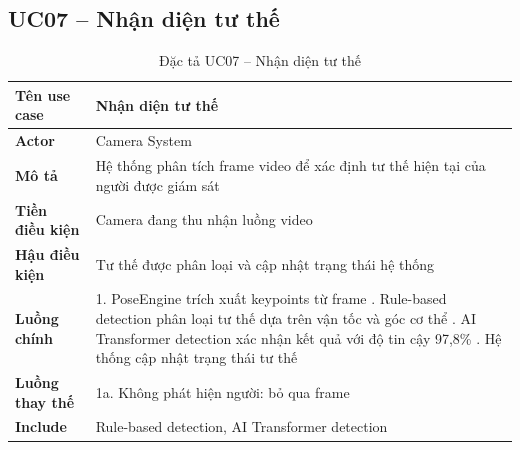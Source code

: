 \subsection*{UC07 -- Nhận diện tư thế}
\begin{table}[H]
    \captionsetup{justification=raggedright, singlelinecheck=false}
    \caption{Đặc tả UC07 -- Nhận diện tư thế}
\centering
\begin{tabular}{|p{3.5cm}|p{10cm}|}
\hline
\textbf{Tên use case} & Nhận diện tư thế \\
\hline
\textbf{Actor} & Camera System \\
\hline
\textbf{Mô tả} & Hệ thống phân tích frame video để xác định
  tư thế hiện tại của người được giám sát \\
\hline
\textbf{Tiền điều kiện} & Camera đang thu nhận luồng video \\
\hline
\textbf{Hậu điều kiện} & Tư thế được phân loại và cập nhật
  trạng thái hệ thống \\
\hline
\textbf{Luồng chính} &
  1. PoseEngine trích xuất keypoints từ frame \newline
  2. Rule-based detection phân loại tư thế dựa trên
     vận tốc và góc cơ thể \newline
  3. AI Transformer detection xác nhận kết quả với
     độ tin cậy 97,8\% \newline
  4. Hệ thống cập nhật trạng thái tư thế \\
\hline
\textbf{Luồng thay thế} &
  1a. Không phát hiện người: bỏ qua frame \\
\hline
\textbf{Include} & Rule-based detection,
  AI Transformer detection \\
\hline
\end{tabular}
\end{table}

